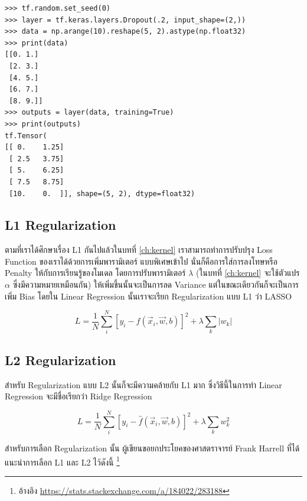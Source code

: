 \begin{lstlisting}[style=MyPython]
>>> tf.random.set_seed(0)
>>> layer = tf.keras.layers.Dropout(.2, input_shape=(2,))
>>> data = np.arange(10).reshape(5, 2).astype(np.float32)
>>> print(data)
[[0. 1.]
 [2. 3.]
 [4. 5.]
 [6. 7.]
 [8. 9.]]
>>> outputs = layer(data, training=True)
>>> print(outputs)
tf.Tensor(
[[ 0.    1.25]
 [ 2.5   3.75]
 [ 5.    6.25]
 [ 7.5   8.75]
 [10.    0.  ]], shape=(5, 2), dtype=float32)
\end{lstlisting}

\subsection{L1 Regularization}
\label{ssec:l1_reg}

ตามที่เราได้ศึกษาเรื่อง L1 กันไปแล้วในบทที่ \ref{ch:kernel} เราสามารถทำการปรับปรุง Loss Function ของเราได้ด้วยการเพิ่มพารามิเตอร์%
แบบพิเศษเข้าไป นั่นก็คือการใส่การลงโทษหรือ Penalty ให้กับการเรียนรู้ของโมเดล โดยการปรับพารามิเตอร์ $\lambda$ (ในบทที่ \ref{ch:kernel}
จะใช้ตัวแปร $\alpha$ ซึ่งมีความหมายเหมือนกัน) ให้เพิ่มขึ้นนั้นจะเป็นการลด Variance แต่ในขณะเดียวกันก็จะเป็นการเพิ่ม Bias โดยใน 
Linear Regression นั้นเราจะเรียก Regularization แบบ L1 ว่า LASSO

\begin{equation}
    L = \frac{1}{N}\sum_i^N \left[y_i - \hat{f}(\vec{x}_i, \vec{w}, b)\right]^2 + \lambda \sum_k \left|w_k\right|
\end{equation}

\subsection{L2 Regularization}
\label{ssec:l2_reg}

สำหรับ Regularization แบบ L2 นั้นก็จะมีความคล้ายกับ L1 มาก ซึ่งวิธีนี้ในการทำ Linear Regression จะมีชื่อเรียกว่า Ridge Regression

\begin{equation}
    L = \frac{1}{N}\sum_i^N \left[y_i - \hat{f}(\vec{x}_i, \vec{w}, b)\right]^2 + \lambda \sum_k w_k^2
\end{equation}

สำหรับการเลือก Regularization นั้น ผู้เขียนขอยกประโยคของศาสตราจารย์ Frank Harrell ที่ได้แนะนำการเลือก L1 และ L2 ไว้ดังนี้%
\footnote{อ้างอิง \url{https://stats.stackexchange.com/a/184022/283188}}

